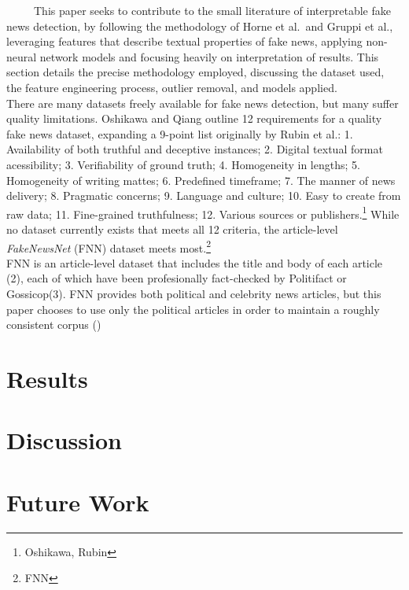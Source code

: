\documentclass[12pt]{article}
\begin{document}
~~~~~This paper seeks to contribute to the small literature of
interpretable fake news detection, by following the methodology of Horne
et al.~and Gruppi et al., leveraging features that describe textual
properties of fake news, applying non-neural network models and focusing
heavily on interpretation of results. This section details the precise
methodology employed, discussing the dataset used, the feature
engineering process, outlier removal, and models applied.\\
\hspace*{0.333em}\hspace*{0.333em}\hspace*{0.333em}\hspace*{0.333em}\hspace*{0.333em}There
are many datasets freely available for fake news detection, but many
suffer quality limitations. Oshikawa and Qiang outline 12 requirements
for a quality fake news dataset, expanding a 9-point list originally by
Rubin et al.: 1. Availability of both truthful and deceptive instances;
2. Digital textual format acessibility; 3. Verifiability of ground
truth; 4. Homogeneity in lengths; 5. Homogeneity of writing mattes; 6.
Predefined timeframe; 7. The manner of news delivery; 8. Pragmatic
concerns; 9. Language and culture; 10. Easy to create from raw data; 11.
Fine-grained truthfulness; 12. Various sources or publishers.\footnote{Oshikawa,
  Rubin} While no dataset currently exists that meets all 12 criteria,
the article-level \emph{FakeNewsNet} (FNN) dataset meets most.\footnote{FNN}\\
\hspace*{0.333em}\hspace*{0.333em}\hspace*{0.333em}\hspace*{0.333em}\hspace*{0.333em}FNN
is an article-level dataset that includes the title and body of each
article (2), each of which have been profesionally fact-checked by
Politifact or Gossicop(3). FNN provides both political and celebrity
news articles, but this paper chooses to use only the political articles
in order to maintain a roughly consistent corpus ()

\section{Results}

\section{Discussion}

\section{Future Work}



\end{document}
